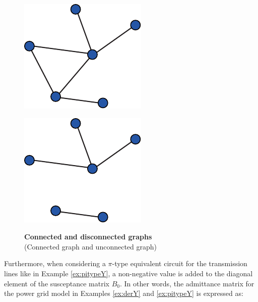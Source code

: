 \documentclass[graybox, envcountchap]{svmult}
\begin{document}
\begin{figure}[t]
  \centering
  {
  \begin{minipage}{0.42\linewidth}
    \centering
    \includegraphics[width = .6\linewidth]{figs/congraph}
    \medskip
    \label{fig:congraph} 
  \end{minipage}
  \begin{minipage}{0.42\linewidth}
    \centering
    \includegraphics[width = .6\linewidth]{figs/notcongraph}
    \medskip
    \label{fig:notcongraph} 
  \end{minipage}
  }
\medskip
\caption{\textbf{Connected and disconnected graphs} \\ \centering(Connected
graph and unconnected graph)}
\label{fig:congraphab} 
\medskip
\end{figure}

Furthermore, when considering a $\pi$-type equivalent circuit for the
transmission lines like in Example \ref{ex:pitypeY}, a non-negative value is
added to the diagonal element of the susceptance matrix $B_0$. In other words,
the admittance matrix for the power grid model in Examples \ref{ex:derY} and
\ref{ex:pitypeY} is expressed as:
\end{document}
